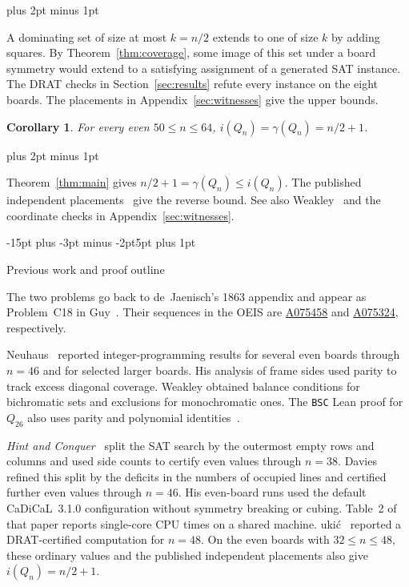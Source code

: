 \documentclass[11pt,a4paper]{article}
\makeatletter
\renewcommand{\subsection}{\@startsection{subsection}{2}{\z@}%
  {-15pt plus -3pt minus -2pt}{5pt plus 1pt}%
  {\normalfont\bfseries\raggedright}}
\renewenvironment{proof}[1][\proofname]{%
  \par\pushQED{\qed}\normalfont
  \topsep8pt plus 2pt minus 1pt\relax
  \trivlist\item[\hskip\labelsep\itshape #1\@addpunct{.}]\ignorespaces
}{\popQED\endtrivlist\@endpefalse}
\theoremstyle{result}
\newtheorem{corollary}[theorem]{Corollary}
\theoremstyle{definition}
\theoremstyle{remark}
\makeatother
\begin{document}
\begin{proof}
A dominating set of size at most $k=n/2$ extends to one of size $k$
by adding squares. By Theorem~\ref{thm:coverage}, some image of
this set under a board symmetry would extend to a satisfying
assignment of a generated SAT instance. The DRAT checks in
Section~\ref{sec:results} refute every instance on the eight boards.
The placements in Appendix~\ref{sec:witnesses} give the upper bounds.
\end{proof}

\begin{corollary}\label{cor:indep}
For every even $50\le n\le64$, $i(Q_n)=\gamma(Q_n)=n/2+1$.
\end{corollary}

\begin{proof}
Theorem~\ref{thm:main} gives $n/2+1=\gamma(Q_n)\le i(Q_n)$.
The published independent placements~\cite[Section~5, p.~11]{OW2001}
give the reverse bound. See also Weakley~\cite[Proposition~21]{Weakley2022}
and the coordinate checks in Appendix~\ref{sec:witnesses}.
\end{proof}

\newpage
\subsection{Previous work and proof outline}

The two problems go back to de~Jaenisch's 1863 appendix
\cite[2017 corrigendum]{OW2001} and appear as Problem~C18 in
Guy~\cite{Guy1994}. Their sequences in the OEIS are
\href{https://oeis.org/A075458}{A075458} and
\href{https://oeis.org/A075324}{A075324}, respectively.

Neuhaus~\cite[Section~2.4 and Chapter~4]{Neuhaus2009} reported
integer-programming results for several even boards through $n=46$
and for selected larger boards. His analysis of frame sides used
parity to track excess diagonal coverage. Weakley
\cite[Sections~2--3]{Weakley2022} obtained balance conditions for
bichromatic sets and exclusions for monochromatic ones. The
\texttt{BSC} Lean proof for $Q_{26}$ also uses parity and polynomial
identities~\cite{BSC2026}.

\emph{Hint and Conquer}~\cite{Hint2026} split the SAT search by
the outermost empty rows and columns and used side counts to
certify even values through $n=38$. Davies
\cite[Sections~2 and~4]{Davies2026} refined this split by the
deficits in the numbers of occupied lines and certified further
even values through $n=46$. His even-board runs used the default
CaDiCaL~3.1.0 configuration without symmetry breaking or cubing.
Table~2 of that paper reports single-core CPU times on a shared
machine. \DJ uki\'c~\cite{Djukic2026} reported a DRAT-certified
computation for $n=48$. On the even boards with $32\le n\le48$,
these ordinary values and the published independent placements
also give $i(Q_n)=n/2+1$.
\end{document}
